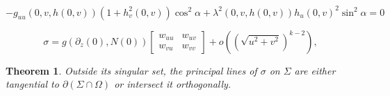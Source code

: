 \documentclass[10pt,a4paper]{amsart}
\newtheorem{theorem}{Theorem}
\begin{document}
    \begin{equation}
     -g_{uu}(0,v,h(0,v))(1+h_v^2(0,v))\cos^2\alpha+\lambda^2(0,v,h(0,v)) h_u(0,v)^2\sin^2\alpha=0
    \end{equation}

\begin{equation}\label{formula sigma}
\sigma=g(\partial_z(0),N(0)) \begin{bmatrix}
    w_{uu} & w_{uv} \\ w_{vu} & w_{vv}
\end{bmatrix}+o((\sqrt{u^2+v^2})^{k-2}),
\end{equation}

\begin{theorem}\label{thm: mainA}
     Outside its singular set, the principal lines of $\sigma$ on $\Sigma$ are either tangential to $\partial(\Sigma\cap \Omega)$ or intersect it orthogonally.
\end{theorem}
\end{document}
